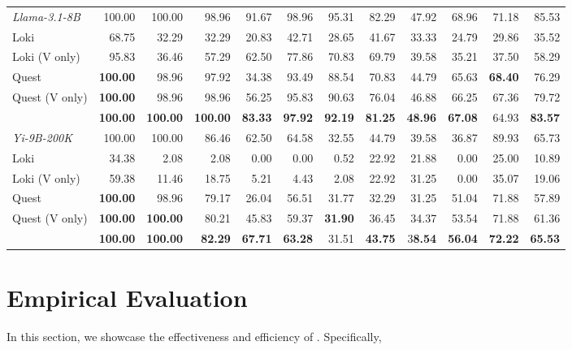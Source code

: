 \begin{table}[h]
\begin{tabular}{l|rrrrrrrrrr|r}
\midrule
\textit{Llama-3.1-8B} & 100.00 & 100.00 & 98.96 & 91.67 & 98.96 & 95.31 & 82.29 & 47.92 & 68.96 & 71.18 &85.53\\
         Loki & 68.75 & 32.29 & 32.29 & 20.83 & 42.71 & 28.65 & 41.67 & 33.33 & 24.79 & 29.86&35.52\\
         Loki (V only) & 95.83 & 36.46 & 57.29 & 62.50 & 77.86 & 70.83 & 69.79 & 39.58 & 35.21 & 37.50&58.29\\
	Quest &  \textbf{100.00} & 98.96 & 97.92 & 34.38 & 93.49 & 88.54 & 70.83 & 44.79 & 65.63 & \textbf{68.40} & 76.29  \\
        Quest (V only) & \textbf{100.00} & 98.96 & 98.96 & 56.25 & 95.83 & 90.63 & 76.04 & 46.88 & 66.25 & 67.36&79.72\\
	\rowcolor{cyan!10}
	\Sys  & \textbf{100.00} & \textbf{100.00} & \textbf{100.00} & \textbf{83.33} & \textbf{97.92} & \textbf{92.19} & \textbf{81.25} & \textbf{48.96} & \textbf{67.08} & 64.93 &\textbf{83.57}\\

     \midrule
        \textit{Yi-9B-200K}& 100.00& 100.00 & 86.46&62.50&64.58&32.55&44.79&39.58&36.87&89.93 & 65.73\\
         Loki & 34.38 & 2.08& 2.08 & 0.00 & 0.00 & 0.52 & 22.92 & 21.88 & 0.00 & 25.00& 10.89\\
         Loki (V only) & 59.38 & 11.46 & 18.75 & 5.21 & 4.43 & 2.08 & 22.92 & 31.25 & 0.00 & 35.07 & 19.06\\
	Quest &  \textbf{100.00} & 98.96 & 79.17 & 26.04 & 56.51& 31.77 & 32.29 & 31.25 & 51.04 & 71.88 &57.89\\
         Quest (V only) &\textbf{100.00} & \textbf{100.00} & 80.21 & 45.83 & 59.37 & \textbf{31.90} & 36.45 & 34.37 & 53.54 & 71.88 & 61.36\\
	\rowcolor{cyan!10}
	\Sys  & \textbf{100.00} & \textbf{100.00} & \textbf{82.29} & \textbf{67.71} & \textbf{63.28} & 31.51 & \textbf{43.75}&3\textbf{8.54} & \textbf{56.04}&\textbf{72.22}&\textbf{65.53}\\

  \bottomrule
\end{tabular}
\label{tab:ruler}
\end{table}

\section{Empirical Evaluation}
\label{sec:evaluation}
In this section, we showcase the effectiveness and efficiency of \Sys. Specifically,

